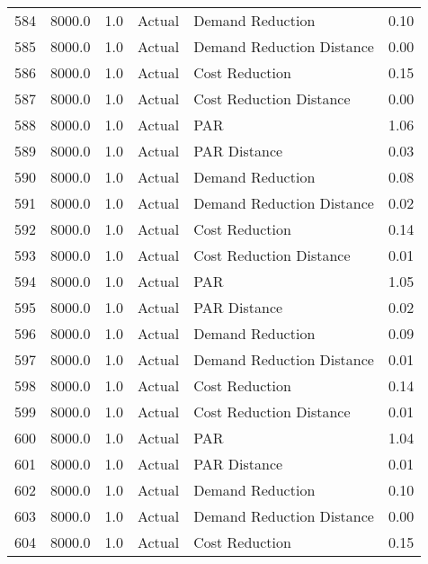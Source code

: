 \begin{longtable}{lrrllr}
584  &       8000.0 &     1.0 &         Actual &           Demand Reduction &   0.10 \\
585  &       8000.0 &     1.0 &         Actual &  Demand Reduction Distance &   0.00 \\
586  &       8000.0 &     1.0 &         Actual &             Cost Reduction &   0.15 \\
587  &       8000.0 &     1.0 &         Actual &    Cost Reduction Distance &   0.00 \\
588  &       8000.0 &     1.0 &         Actual &                        PAR &   1.06 \\
589  &       8000.0 &     1.0 &         Actual &               PAR Distance &   0.03 \\
590  &       8000.0 &     1.0 &         Actual &           Demand Reduction &   0.08 \\
591  &       8000.0 &     1.0 &         Actual &  Demand Reduction Distance &   0.02 \\
592  &       8000.0 &     1.0 &         Actual &             Cost Reduction &   0.14 \\
593  &       8000.0 &     1.0 &         Actual &    Cost Reduction Distance &   0.01 \\
594  &       8000.0 &     1.0 &         Actual &                        PAR &   1.05 \\
595  &       8000.0 &     1.0 &         Actual &               PAR Distance &   0.02 \\
596  &       8000.0 &     1.0 &         Actual &           Demand Reduction &   0.09 \\
597  &       8000.0 &     1.0 &         Actual &  Demand Reduction Distance &   0.01 \\
598  &       8000.0 &     1.0 &         Actual &             Cost Reduction &   0.14 \\
599  &       8000.0 &     1.0 &         Actual &    Cost Reduction Distance &   0.01 \\
600  &       8000.0 &     1.0 &         Actual &                        PAR &   1.04 \\
601  &       8000.0 &     1.0 &         Actual &               PAR Distance &   0.01 \\
602  &       8000.0 &     1.0 &         Actual &           Demand Reduction &   0.10 \\
603  &       8000.0 &     1.0 &         Actual &  Demand Reduction Distance &   0.00 \\
604  &       8000.0 &     1.0 &         Actual &             Cost Reduction &   0.15 \\

\end{longtable}
